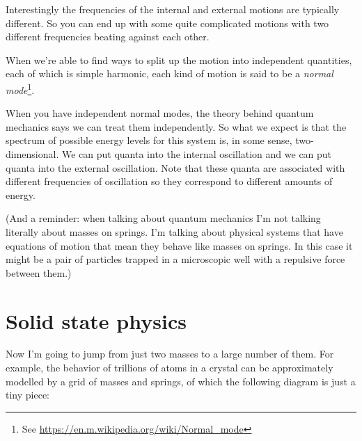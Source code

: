 \documentclass[a4paper]{article}
\begin{document}
Interestingly the frequencies of the internal and external motions are typically different.
So you can end up with some quite complicated motions with two different frequencies beating against each other.

When we're able to find ways to split up the motion into independent quantities, each of which is simple harmonic, each kind of motion is said to be a {\em normal mode}\footnote{See \url{https://en.m.wikipedia.org/wiki/Normal_mode}}.

When you have independent normal modes, the theory behind quantum mechanics says we can treat them independently.
So what we expect is that the spectrum of possible energy levels for this system is, in some sense, two-dimensional.
We can put quanta into the internal oscillation and we can put quanta into the external oscillation.
Note that these quanta are associated with different frequencies of oscillation so they correspond to different amounts of energy.

(And a reminder: when talking about quantum mechanics I'm not talking literally about masses on springs. I'm talking about physical systems that have equations of motion that mean they behave like masses on springs. In this case it might be a pair of particles trapped in a microscopic well with a repulsive force between them.)

\section{Solid state physics}
Now I'm going to jump from just two masses to a large number of them.
For example, the behavior of trillions of atoms in a crystal can be approximately modelled by a grid of masses and springs, of which the following diagram is just a tiny piece:
\end{document}
